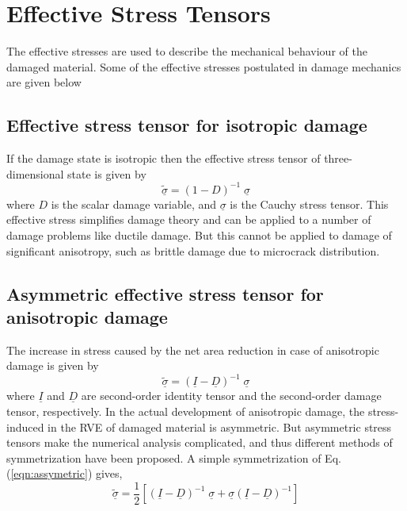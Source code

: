 \documentclass[12pt,a4paper,twoside,openright]{report}
\begin{document}
\section{Effective Stress Tensors}
\indent\indent\indent The effective stresses are used to describe the mechanical behaviour of the damaged material. Some of the effective stresses postulated in damage mechanics are given below
\subsection{Effective stress tensor for isotropic damage \citep{lemaitre1978aspect}}
\indent\indent\indent If the damage state is isotropic then the effective stress tensor of three-dimensional state is given by
\begin{equation}
 \underline{\tilde{\sigma}} = (1 - D)^{-1} \; \underline{\sigma}
\end{equation}
where $D$ is the scalar damage variable, and $\underline{\sigma}$ is the Cauchy stress tensor. This effective stress simplifies damage theory and can be applied to a number of damage problems like ductile damage. But this cannot be applied to damage of significant anisotropy, such as brittle damage due to microcrack distribution.
\subsection{Asymmetric effective stress tensor for anisotropic damage \citep{murakami2012continuum}}
\indent\indent\indent The increase in stress caused by the net area reduction in case of anisotropic damage is given by
\begin{equation}
\underline{\tilde{\sigma}} = (\underline{I} - \underline{D})^{-1} \; \underline{\sigma}
\label{eqn:assymetric}
\end{equation}
where $\underline{I}$ and $\underline{D}$ are second-order identity tensor and the second-order damage tensor, respectively. In the actual development of anisotropic damage, the stress-induced in the RVE of damaged material is asymmetric. But asymmetric stress tensors make the numerical analysis complicated, and thus different methods of symmetrization have been proposed. 
A simple symmetrization of Eq. (\ref{eqn:assymetric}) gives,
\begin{equation}
\label{eqn: Murakami and Ohno}
\underline{\tilde{\sigma}} = \frac{1}{2} [(\underline{I} - \underline{D})^{-1}\;\underline{\sigma} + \underline{\sigma}(\underline{I} - \underline{D})^{-1}]
\end{equation}
\end{document}
